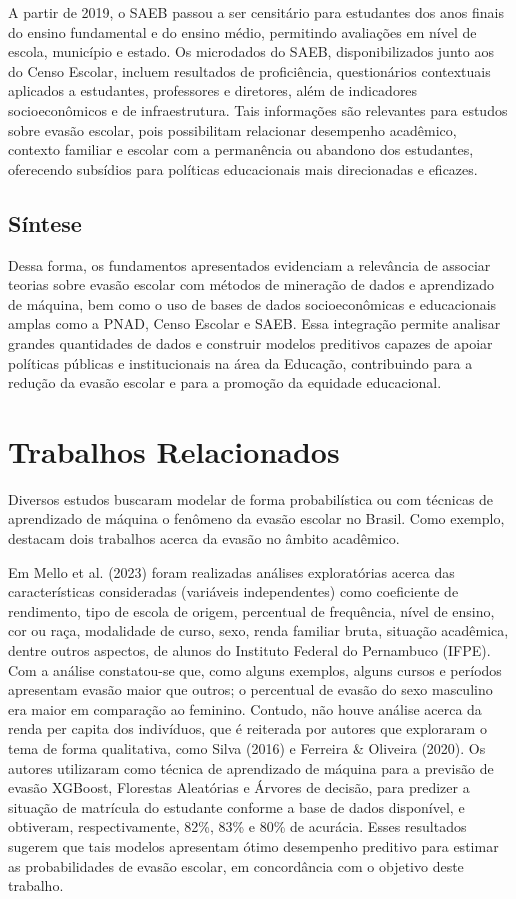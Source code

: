 \documentclass[english, spanish, brazilian]{RBIEarticle} %
\begin{document}
A partir de 2019, o SAEB passou a ser censitário para estudantes dos anos finais do ensino fundamental e do ensino médio, permitindo avaliações em nível de escola, município e estado. Os microdados do SAEB, disponibilizados junto aos do Censo Escolar, incluem resultados de proficiência, questionários contextuais aplicados a estudantes, professores e diretores, além de indicadores socioeconômicos e de infraestrutura. Tais informações são relevantes para estudos sobre evasão escolar, pois possibilitam relacionar desempenho acadêmico, contexto familiar e escolar com a permanência ou abandono dos estudantes, oferecendo subsídios para políticas educacionais mais direcionadas e eficazes.

\subsection{Síntese}
Dessa forma, os fundamentos apresentados evidenciam a relevância de associar teorias sobre evasão escolar com métodos de mineração de dados e aprendizado de máquina, bem como o uso de bases de dados socioeconômicas e educacionais amplas como a PNAD, Censo Escolar e SAEB. Essa integração permite analisar grandes quantidades de dados e construir modelos preditivos capazes de apoiar políticas públicas e institucionais na área da Educação, contribuindo para a redução da evasão escolar e para a promoção da equidade educacional.

\section{Trabalhos Relacionados}
Diversos estudos buscaram modelar de forma probabilística ou com técnicas de aprendizado de
máquina o fenômeno da evasão escolar no Brasil. Como exemplo, destacam dois trabalhos acerca
da evasão no âmbito acadêmico.

Em Mello et al. (2023) foram realizadas análises exploratórias acerca das características
consideradas (variáveis independentes) como coeficiente de rendimento, tipo de escola de origem,
percentual de frequência, nível de ensino, cor ou raça, modalidade de curso, sexo, renda familiar
bruta, situação acadêmica, dentre outros aspectos, de alunos do Instituto Federal do Pernambuco
(IFPE). Com a análise constatou-se que, como alguns exemplos, alguns cursos e períodos apresentam
evasão maior que outros; o percentual de evasão do sexo masculino era maior em comparação ao
feminino. Contudo, não houve análise acerca da renda per capita dos indivíduos, que é reiterada
por autores que exploraram o tema de forma qualitativa, como Silva (2016) e Ferreira \& Oliveira
(2020). Os autores utilizaram como técnica de aprendizado de máquina para a previsão de evasão
XGBoost, Florestas Aleatórias e Árvores de decisão, para predizer a situação de matrícula do
estudante conforme a base de dados disponível, e obtiveram, respectivamente, 82\%, 83\% e 80\%
de acurácia. Esses resultados sugerem que tais modelos apresentam ótimo desempenho preditivo
para estimar as probabilidades de evasão escolar, em concordância com o objetivo deste trabalho.
\end{document}
